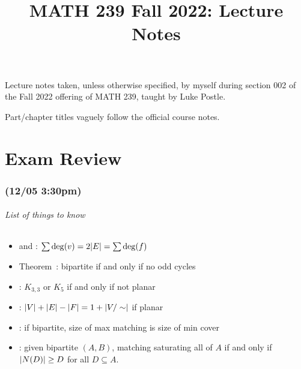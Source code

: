 \documentclass[class=math239,notes,tikz]{agony}
\title{MATH 239 Fall 2022: Lecture Notes}
\begin{document}
\renewcommand{\contentsname}{MATH 239 Fall 2022:\\{\huge Lecture Notes}}
\thispagestyle{firstpage}
\tableofcontents

Lecture notes taken, unless otherwise specified,
by myself during section 002 of the Fall 2022 offering of MATH 239,
taught by Luke Postle.

Part/chapter titles vaguely follow the official course notes.




\part{Exam Review}

\setcounter{section}{11}
\section{(12/05 3:30pm)}

\paragraph{List of things to know}
\begin{itemize}[nosep]
  \item {} and : $\sum \deg(v) = 2\abs{E} = \sum \deg(f)$
  \item Theorem~: bipartite if and only if no odd cycles
  \item {}: $K_{3,3}$ or $K_5$ if and only if not planar
  \item {}: $\abs{V} + \abs{E} - \abs{F} = 1 + \abs{V/\sim}$ if planar
  \item {}: if bipartite, size of max matching is size of min cover
  \item {}: given bipartite $(A, B)$, matching saturating all of $A$
        if and only if $\abs{N(D)} \geq D$ for all $D \subseteq A$.
\end{itemize}
\end{document}
